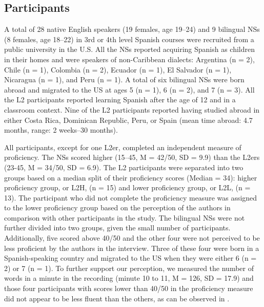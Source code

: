 \documentclass[output=paper,colorlinks,citecolor=brown,draftmode]{langscibook}
\begin{document}
\subsection{Participants}
\largerpage
A total of 28 native English speakers (19 females, age 19--24) and 9 bilingual NSs (8 females, age 18--22) in 3rd or 4th level Spanish courses were recruited from a public university in the U.S. All the NSs reported acquiring Spanish as children in their homes and were speakers of non-Caribbean dialects: Argentina (n = 2), Chile (n = 1), Colombia (n = 2), Ecuador (n = 1), El Salvador (n = 1), Nicaragua (n = 1), and Peru (n = 1). A total of six bilingual NSs were born abroad and migrated to the US at ages 5 (n = 1), 6 (n = 2), and 7 (n = 3). All the L2 participants reported learning Spanish after the age of 12 and in a classroom context. Nine of the L2 participants reported having studied abroad in either Costa Rica, Dominican Republic, Peru, or Spain (mean time abroad: 4.7 months, range: 2 weeks--30 months).

 All participants, except for one L2er, completed an independent measure of proficiency. The NSs scored higher (15--45, M = 42/50, SD = 9.9) than the L2ers (23-45, M = 34/50, SD = 6.9). The L2 participants were separated into two groups based on a median split of their proficiency scores (Median = 34): higher proficiency group, or L2H, (n = 15) and lower proficiency group, or L2L, (n = 13). The participant who did not complete the proficiency measure was assigned to the lower proficiency group based on the perception of the authors in comparison with other participants in the study. The bilingual NSs were not further divided into two groups, given the small number of participants. Additionally, five scored above 40/50 and the other four were not perceived to be less proficient by the authors in the interview. Three of these four were born in a Spanish-speaking country and migrated to the US when they were either 6 (n = 2) or 7 (n = 1). To further support our perception, we measured the number of words in a minute in the recording (minute 10 to 11, M = 126, SD = 17.9) and those four participants with scores lower than 40/50 in the proficiency measure did not appear to be less fluent than the others, as can be observed in .
\end{document}
